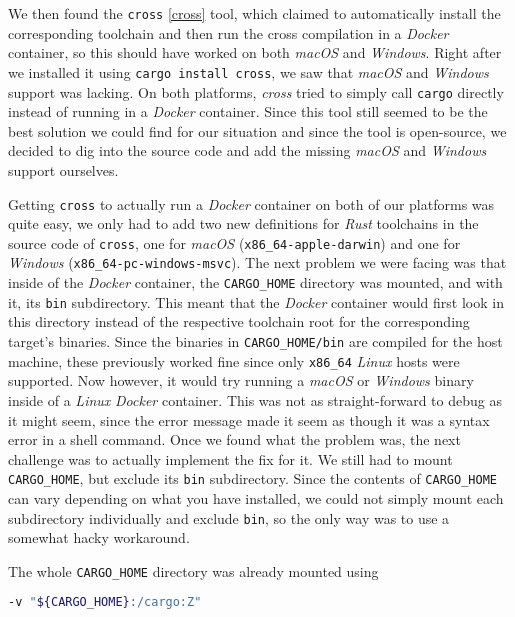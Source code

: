 We then found the \texttt{cross} \ref{cross} tool, which claimed to automatically install the
corresponding toolchain and then run the cross compilation in a \textit{Docker} container, so this
should have worked on both \textit{macOS} and \textit{Windows}. Right after we installed it using
\texttt{cargo install cross}, we saw that \textit{macOS} and \textit{Windows} support was lacking.
On both platforms, \textit{cross} tried to simply call \texttt{cargo} directly instead of running in a
\textit{Docker} container. Since this tool still seemed to be the best solution we could find for
our situation and since the tool is open-source, we decided to dig into the source code and add the
missing \textit{macOS} and \textit{Windows} support ourselves.

Getting \texttt{cross} to actually run a \textit{Docker} container on both of our platforms was quite easy,
we only had to add two new definitions for \textit{Rust} toolchains in the source code of
\texttt{cross}, one for \textit{macOS} (\texttt{x86\_64-apple-darwin}) and one for \textit{Windows}
(\texttt{x86\_64-pc-windows-msvc}). The next problem we were facing was that inside of the
\textit{Docker} container, the \texttt{CARGO\_HOME} directory was mounted, and with it, its
\texttt{bin} subdirectory. This meant that the \textit{Docker} container would first look in this
directory instead of the respective toolchain root for the corresponding target's binaries. Since
the binaries in \texttt{CARGO\_HOME/bin} are compiled for the host machine, these previously worked
fine since only \texttt{x86\_64} \textit{Linux} hosts were supported. Now however, it would try
running a \textit{macOS} or \textit{Windows} binary inside of a \textit{Linux} \textit{Docker}
container. This was not as straight-forward to debug as it might seem, since the error message made
it seem as though it was a syntax error in a shell command. Once we found what the problem was, the
next challenge was to actually implement the fix for it. We still had to mount \texttt{CARGO\_HOME},
but exclude its \texttt{bin} subdirectory. Since the contents of \texttt{CARGO\_HOME} can vary
depending on what you have installed, we could not simply mount each subdirectory individually and
exclude \texttt{bin}, so the only way was to use a somewhat hacky workaround.

The whole \texttt{CARGO\_HOME} directory was already mounted using

\begin{lstlisting}[language=Bash]
-v "${CARGO_HOME}:/cargo:Z"
\end{lstlisting}

